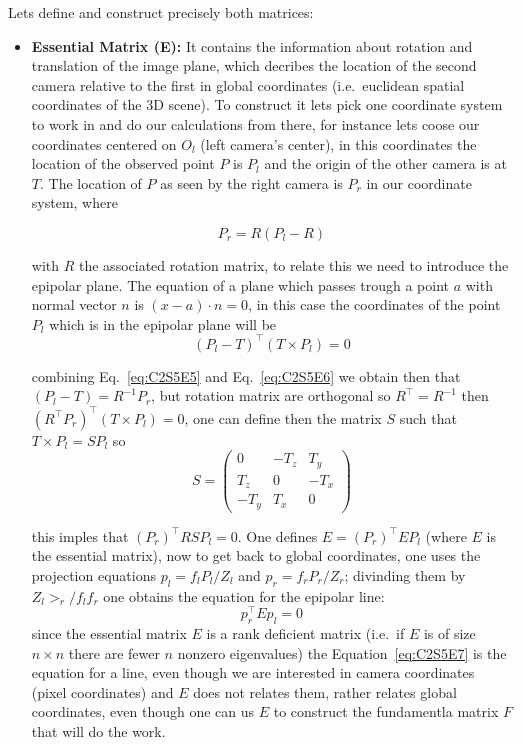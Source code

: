 Lets define and construct precisely both matrices:
\begin{itemize}
\item \textbf{Essential Matrix (E):} It contains the information about rotation and translation of the image plane, which decribes the location of the second camera relative to the first in global coordinates (i.e.\ euclidean spatial coordinates of the 3D scene). To construct it lets pick one coordinate system to work in and do our calculations from there, for instance lets coose our coordinates centered on $O_l$ (left camera's center), in this coordinates the location of the observed point $P$ is $P_l$ and the origin of the other camera is at $T$. The location of $P$ as seen by the right camera is $P_r$ in our coordinate system, where 

\begin{equation}
\label{eq:C2S5E5}
P_r=R(P_l-R)
\end{equation}

with $R$ the associated rotation matrix, to relate this we need to introduce the epipolar plane. The equation of a plane which passes trough a point $a$ with normal vector $n$ is $(x-a)\cdot n=0$, in this case the coordinates of the point $P_l$ which is in the epipolar plane will be 
\begin{equation}
\label{eq:C2S5E6}
(P_l-T)^{\intercal}(T\times P_l)=0
\end{equation}

combining Eq.~\ref{eq:C2S5E5} and Eq.~\ref{eq:C2S5E6} we obtain then that $(P_l-T)=R^{-1}P_r$, but rotation matrix are orthogonal so $R^{\intercal}=R^{-1}$ then $(R^{\intercal}P_r)^{\intercal}(T\times P_l)=0$, one can define then the matrix $S$ such that $T\times P_l=SP_l$ so 
$$
S=
\left(\begin{matrix}
0 & -T_z & T_y \\
T_z & 0 & -T_x \\
-T_y & T_x & 0
\end{matrix}\right)
$$

this imples that $(P_r)^{\intercal}RSP_l=0$. One defines $E=(P_r)^{\intercal}EP_l$ (where $E$ is the essential matrix), now to get back to global coordinates, one uses the projection equations $p_l=f_lP_l/Z_l$ and $p_r=f_rP_r/Z_r$; divinding them by $Z_l>_r/f_lf_r$ one obtains the equation for the epipolar line:
\begin{equation}
\label{eq:C2S5E7}
p_r^{\intercal}Ep_l=0
\end{equation}
since the essential matrix $E$ is a rank deficient matrix (i.e.\ if $E$ is of size $n\times n$ there are fewer $n$ nonzero eigenvalues) the Equation~\ref{eq:C2S5E7} is the equation for a line, even though we are interested in camera coordinates (pixel coordinates) and $E$ does not relates them, rather relates global coordinates, even though one can us $E$ to construct the fundamentla matrix $F$ that will do the work.


\end{itemize}
